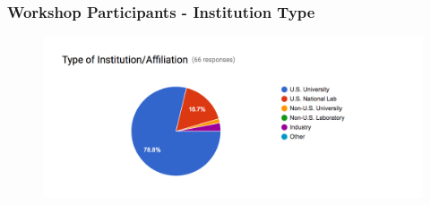 \begin{frame}
\frametitle{Workshop Participants - Institution Type}

\begin{figure}[htbp]
\begin{center}
\includegraphics[width=1.0\textwidth]{images/s2i2-hep-cs-princeton-4-institution.png}
\end{center}
\end{figure}

\end{frame}


